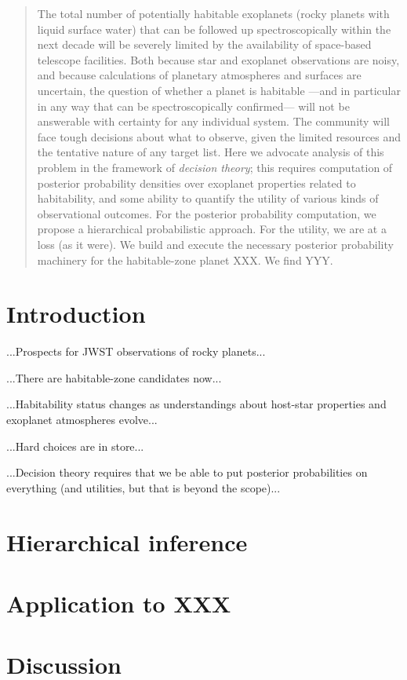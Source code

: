 \documentclass[12pt,letterpaper]{article}
\begin{document}
\begin{abstract}
The total number of potentially habitable exoplanets
  (rocky planets with liquid surface water)
  that can be followed up spectroscopically within the next decade
  will be severely limited
  by the availability of space-based telescope facilities.
Both because star and exoplanet observations are noisy,
  and because calculations of planetary atmospheres and surfaces are uncertain,
  the question of whether a planet is habitable%
  ---and in particular in any way that can be spectroscopically confirmed---%
  will not be answerable with certainty for any individual system.
The community will face tough decisions about what to observe,
  given the limited resources and the tentative nature of any target list.
Here we advocate analysis of this problem in the framework of \emph{decision theory};
  this requires computation of posterior probability densities
  over exoplanet properties related to habitability,
  and some ability to quantify the utility of various kinds of observational outcomes.
For the posterior probability computation,
  we propose a hierarchical probabilistic approach.
For the utility, we are at a loss (as it were).
We build and execute the necessary posterior probability machinery
  for the habitable-zone planet XXX.
We find YYY.
\end{abstract}

\section{Introduction}

...Prospects for JWST observations of rocky planets...

...There are habitable-zone candidates now...

...Habitability status changes as understandings about host-star properties and exoplanet atmospheres evolve...

...Hard choices are in store...

...Decision theory requires that we be able to put posterior probabilities on everything (and utilities, but that is beyond the scope)...

\section{Hierarchical inference}

\section{Application to XXX}

\section{Discussion}
\end{document}
